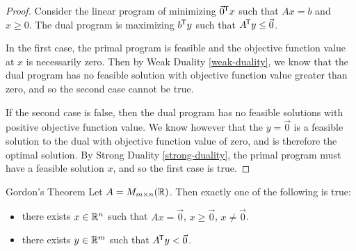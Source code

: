 \begin{proof}
    Consider the linear program of minimizing ${\vec{0}}^{\mkern-1.5mu\mathsf{T}}x$ such that $Ax = b$ and $x \geq {0}$. The dual program is maximizing ${b}^{\mkern-1.5mu\mathsf{T}}y$ such that ${A}^{\mkern-1.5mu\mathsf{T}}y \leq \vec{0}$.

    In the first case, the primal program is feasible and the objective function value at $x$ is necessarily zero. Then by Weak Duality \ref{weak-duality}, we know that the dual program has no feasible solution with objective function value greater than zero, and so the second case cannot be true.

    If the second case is false, then the dual program has no feasible solutions with positive objective function value. We know however that the $y = \vec{0}$ is a feasible solution to the dual with objective function value of zero, and is therefore the optimal solution. By Strong Duality \ref{strong-duality}, the primal program must have a feasible solution $x$, and so the first case is true.
\end{proof}

\begin{thm}{Gordon's Theorem}\label{gordons}\proofbreak
    Let $A = M_{m \times n}(\mathbb{R})$. Then exactly one of the following is true:
    \begin{itemize}
        \item there exists $x \in \mathbb{R}^n$ such that $Ax = \vec{0}$, $x \geq \vec{0}$, $x \neq \vec{0}$.
        \item there exists $y \in \mathbb{R}^m$ such that ${A}^{\mkern-1.5mu\mathsf{T}}y < \vec{0}$.
    \end{itemize}
\end{thm}


